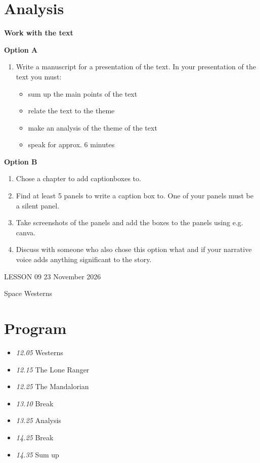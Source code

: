 \documentclass[11pt,a4paper,oneside]{book}
\newcommand{\tasktitle}[1]{{\color{blue}\bfseries #1}\par\smallskip}
\begin{document}
\section*{Analysis}
\tasktitle{Work with the text}
\begin{taskbox}
\tasktitle{Option A}
\begin{enumerate}
\item Write a manuscript for a presentation of the text. In your presentation of the text you must:

\begin{itemize}
\item sum up the main points of the text
\item relate the text to the theme
\item make an analysis of the theme of the text
\item speak for approx. 6 minutes
\end{itemize}

\end{enumerate}
\end{taskbox}
\begin{taskbox}
\tasktitle{Option B}
\begin{enumerate}
\item Chose a chapter to add captionboxes to.
\item Find at least 5 panels to write a caption box to. One of your panels must be a silent panel.
\item Take screenshots of the panels and add the boxes to the panels using e.g. canva.
\item Discuss with someone who also chose this option what and if your narrative voice adds anything significant to the story.
\end{enumerate}
\end{taskbox}

\clearpage{}
{\color{blue}\small LESSON 09 \hfill 23 November 2026\par}
\vspace{4mm}
{\displayfont\color{navy}\fontsize{30}{34}\selectfont Space Westerns\par}\vspace{4mm}

\section*{Program}

\begin{itemize}
\item \emph{12.05} Westerns
\item \emph{12.15} The Lone Ranger
\item \emph{12.25} The Mandalorian
\item \emph{13.10} Break
\item \emph{13.25} Analysis
\item \emph{14.25} Break
\item \emph{14.35} Sum up
\end{itemize}
\end{document}
